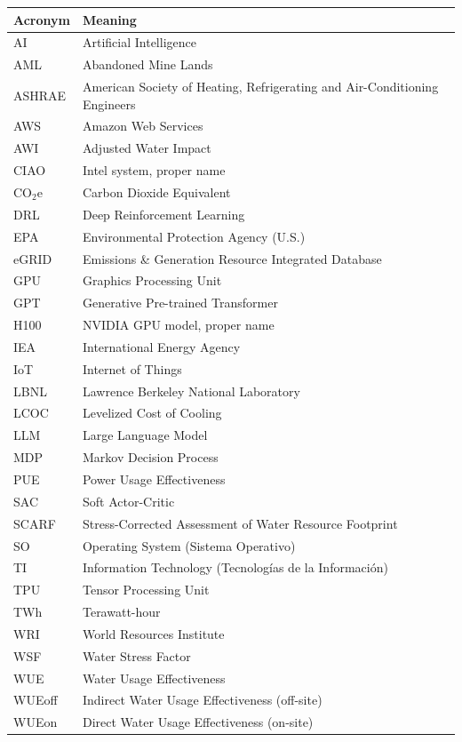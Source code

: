 \documentclass[conference]{IEEEtran}
\begin{document}
\begin{table}[h!]
\centering
\begin{tabular}{@{}ll@{}}
\toprule
\textbf{Acronym} & \textbf{Meaning} \\
\midrule
AI & Artificial Intelligence \\
AML & Abandoned Mine Lands \\
ASHRAE & American Society of Heating, Refrigerating and Air-Conditioning Engineers \\
AWS & Amazon Web Services \\
AWI & Adjusted Water Impact \\
CIAO & Intel system, proper name \\
CO$_2$e & Carbon Dioxide Equivalent \\
DRL & Deep Reinforcement Learning \\
EPA & Environmental Protection Agency (U.S.) \\
eGRID & Emissions \& Generation Resource Integrated Database \\
GPU & Graphics Processing Unit \\
GPT & Generative Pre-trained Transformer \\
H100 & NVIDIA GPU model, proper name \\
IEA & International Energy Agency \\
IoT & Internet of Things \\
LBNL & Lawrence Berkeley National Laboratory \\
LCOC & Levelized Cost of Cooling \\
LLM & Large Language Model \\
MDP & Markov Decision Process \\
PUE & Power Usage Effectiveness \\
SAC & Soft Actor-Critic \\
SCARF & Stress-Corrected Assessment of Water Resource Footprint \\
SO & Operating System (Sistema Operativo) \\
TI & Information Technology (Tecnologías de la Información) \\
TPU & Tensor Processing Unit \\
TWh & Terawatt-hour \\
WRI & World Resources Institute \\
WSF & Water Stress Factor \\
WUE & Water Usage Effectiveness \\
WUEoff & Indirect Water Usage Effectiveness (off-site) \\
WUEon & Direct Water Usage Effectiveness (on-site) \\
\bottomrule
\end{tabular}
\end{table}
\end{document}
